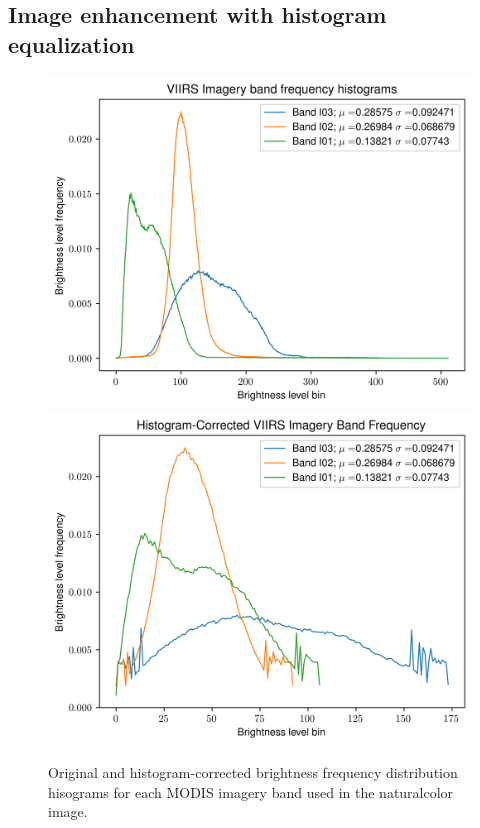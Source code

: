 \documentclass[12pt]{article}
\begin{document}
\clearpage

\subsection{Image enhancement with histogram equalization}

\vspace{2em}

\begin{figure}[h!]
    \centering
    \includegraphics[width=.48\linewidth]{figures/p2/img_histograms.png}
    \includegraphics[width=.48\linewidth]{figures/p2/img_histograms_correct.png}
    \caption{Original and histogram-corrected brightness frequency distribution hisograms for each MODIS imagery band used in the naturalcolor image.}
    \label{p2_histograms}
\end{figure}

\vspace{7.2em}
\end{document}
